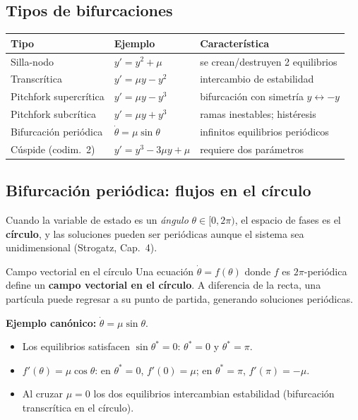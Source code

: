\documentclass[11pt,letterpaper]{article}
\begin{document}
\subsection{Tipos de bifurcaciones}

\begin{center}
\begin{tabular}{lll}
\toprule
Tipo & Ejemplo & Característica\\
\midrule
Silla-nodo & $y'=y^2+\mu$ & se crean/destruyen 2 equilibrios\\
Transcrítica & $y'=\mu y-y^2$ & intercambio de estabilidad\\
Pitchfork supercrítica & $y'=\mu y-y^3$ & bifurcación con simetría $y\leftrightarrow -y$\\
Pitchfork subcrítica & $y'=\mu y+y^3$ & ramas inestables; histéresis\\
Bifurcación periódica & $\dot\theta=\mu\sin\theta$ & infinitos equilibrios periódicos\\
Cúspide (codim.~2) & $y'=y^3-3\mu y+\mu$ & requiere dos parámetros\\
\bottomrule
\end{tabular}
\end{center}

\subsection{Bifurcación periódica: flujos en el círculo}

Cuando la variable de estado es un \emph{ángulo} $\theta\in[0,2\pi)$, el espacio
de fases es el \textbf{círculo}, y las soluciones pueden ser periódicas aunque
el sistema sea unidimensional (Strogatz, Cap.~4).

\begin{definicion}{Campo vectorial en el círculo}{}
Una ecuación $\dot\theta=f(\theta)$ donde $f$ es $2\pi$-periódica define un
\textbf{campo vectorial en el círculo}. A diferencia de la recta, una partícula
puede regresar a su punto de partida, generando soluciones periódicas.
\end{definicion}

\textbf{Ejemplo canónico:} $\dot\theta=\mu\sin\theta$.
\begin{itemize}
  \item Los equilibrios satisfacen $\sin\theta^*=0$: $\theta^*=0$ y $\theta^*=\pi$.
  \item $f'(\theta)=\mu\cos\theta$: en $\theta^*=0$, $f'(0)=\mu$; en $\theta^*=\pi$, $f'(\pi)=-\mu$.
  \item Al cruzar $\mu=0$ los dos equilibrios intercambian estabilidad (bifurcación transcrítica en el círculo).
\end{itemize}
\end{document}
